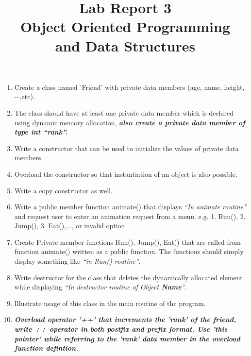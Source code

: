 \documentclass[11pt]{article}
\title{\textbf{Lab Report 3}\\ Object Oriented Programming\\ and Data Structures }
\date{}
\begin{document}
\maketitle
\begin{enumerate}
\item Create a class named 'Friend' with private data members (age, name,
height,$\cdots$,etc).  
\item  The class should have at least one private data
member which is declared using dynamic memory allocation, \emph{\textbf{also create a private data member of type int ``rank''.}}
\item  Write a constructor
that can be used to initialize the values of private data
members. 
\item  Overload the constructor so that instantiation of an object
is also possible. 
\item Write a copy constructor as well. 
\item Write a public member function animate() that displays \emph{``In animate routine''} and request user to enter an animation request from a menu.
e.g. 1. Run(), 2. Jump(), 3. Eat(),..., or invalid option.
\item Create Private member functions Run(), Jump(), Eat() that are called from function animate() written as a public function. The functions should simply display something like \emph{``in Run() routine''}. 
\item Write destructor for the class that deletes the dynamically allocated element while displaying \emph{``In destructor routine of Object \textbf{Name}''}. 
\item Illustrate usage of this class in the main routine of the program.
\item \emph{\textbf{Overload operator '++' that increments the 'rank' of the friend, write ++ operator in both postfix and prefix format. Use 'this pointer' while referring to the 'rank' data member in the overload function defintion.}}
\end{enumerate}
\end{document}
